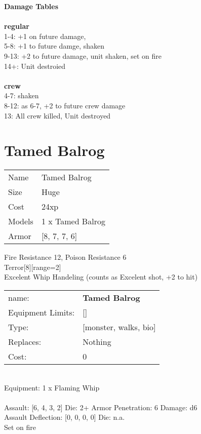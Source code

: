 {\bf Damage Tables} \\
\ \\ {\bf regular } \\
1-4: +1 on future damage, \\
5-8: +1 to future damge, shaken \\
9-13: +2 to future damage, unit shaken, set on fire \\
14+: Unit destroied \\
\ \\ {\bf crew } \\
4-7: shaken \\
8-12: as 6-7, +2 to future crew damage \\
13: All crew killed, Unit destroyed \\










\pagebreak\pagebreak

\section{ Tamed Balrog }

\begin{tabular}{ll}
  Name & Tamed Balrog \\
  Size & Huge\\
  Cost & 24xp\\
  Models & 1 x Tamed Balrog\\
  Armor & [8, 7, 7, 6]\\
\end{tabular}

\noindent Fire Resistance 12, Poison Resistance 6\\ 
Terror[8][range=2]\\ 
Excelent Whip Handeling (counts as Excelent shot, +2 to hit)\\ 


\noindent
\begin{tabular}{ll}
name: &{\bf Tamed Balrog } \\
Equipment Limits: &[] \\
Type: &[monster, walks, bio] \\
Replaces: &Nothing \\
Cost: & 0\\
\end{tabular}
\ \\
Equipment: 1 x Flaming Whip \\
\ \\
Assault: [6, 4, 3, 2] Die: 2+ Armor Penetration: 6 Damage: d6 \\
Assault Deflection: [0, 0, 0, 0] Die: n.a.\\
\indent Set on fire\\ 
 
